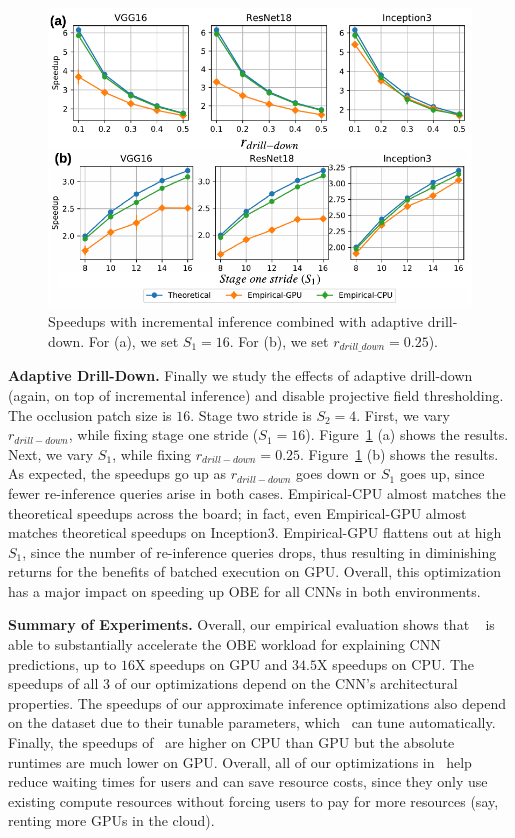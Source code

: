\begin{figure}[t]
\includegraphics[width=\columnwidth]{images/5_2_3_edited}
\vspace{-8mm}
\caption{Speedups with incremental inference combined with adaptive drill-down. For (a), we set $S_1=16$. For (b), we set $r_{drill\_down}=0.25$).}
\vspace{-2mm}
\label{fig:5_2_3_edited}
\end{figure}

\vspace{2mm}
\noindent \textbf{Adaptive Drill-Down.} Finally we study the effects of adaptive drill-down (again, on top of incremental inference) and disable projective field thresholding. The occlusion patch size is $16$. Stage two stride is $S_2 = 4$. First, we vary $r_{drill-down}$, while fixing stage one stride ($S_1 = 16$). Figure~\ref{fig:5_2_3_edited} (a) shows the results. Next, we vary $S_1$, while fixing $r_{drill-down} = 0.25$. Figure~\ref{fig:5_2_3_edited} (b) shows the results. As expected, the speedups go up as $r_{drill-down}$ goes down or $S_1$ goes up, since fewer re-inference queries arise in both cases. Empirical-CPU almost matches the theoretical speedups across the board; in fact, even Empirical-GPU almost matches theoretical speedups on Inception3. Empirical-GPU flattens out at high $S_1$, since the number of re-inference queries drops, thus resulting in diminishing returns for the benefits of batched execution on GPU. Overall, this optimization has a major impact on speeding up OBE for all CNNs in both environments.

\vspace{2mm}
\noindent \textbf{Summary of Experiments.} Overall, our empirical evaluation shows that \system~ is able to substantially accelerate the OBE workload for explaining CNN predictions, up to $16$X speedups on GPU and $34.5$X speedups on CPU. The speedups of all 3 of our optimizations depend on the CNN's architectural properties. The speedups of our approximate inference optimizations also depend on the dataset due to their tunable parameters, which \system ~can tune automatically. Finally, the speedups of \system ~are higher on CPU than GPU but the absolute runtimes are much lower on GPU. Overall, all of our optimizations in \system ~help reduce waiting times for users and can save resource costs, since they only use existing compute resources without forcing users to pay for more resources (say, renting more GPUs in the cloud).